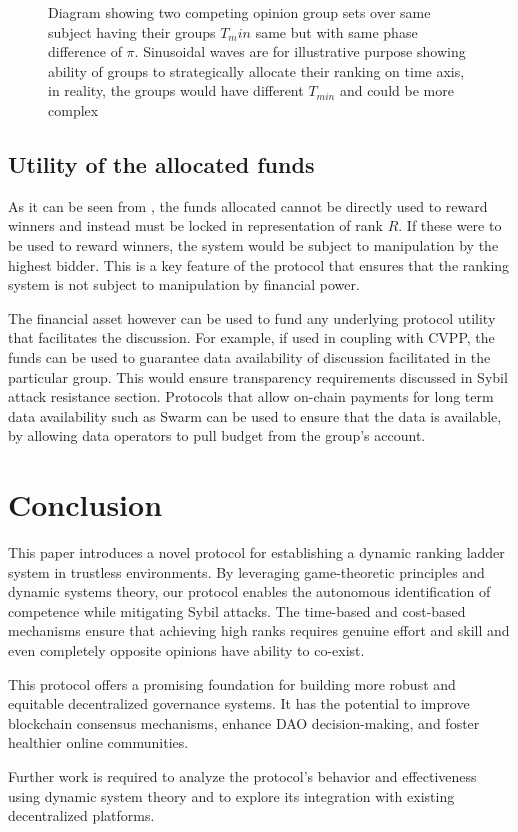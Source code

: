 \documentclass{article}
\begin{document}
\begin{CJK}{UTF8}{gbsn}
\begin{figure}[ht]
\begin{tikzpicture}
        \end{tikzpicture}
        \caption{Diagram showing two competing opinion group sets over same subject having their groups $T_min$ same but with same phase difference of $\pi$. Sinusoidal waves are for illustrative purpose showing ability of groups to strategically allocate their ranking on time axis, in reality, the groups would have different $T_{min}$ and could be more complex
            \label{fig:processes-sinusoidal}}
    \end{figure}

    \subsection*{Utility of the allocated funds}
    As it can be seen from , the funds allocated cannot be directly used to reward winners and instead must be locked in representation of rank $R$. If these were to be used to reward winners, the system would be subject to manipulation by the highest bidder. This is a key feature of the protocol that ensures that the ranking system is not subject to manipulation by financial power.

    The financial asset however can be used to fund any underlying protocol utility that facilitates the discussion. For example, if used in coupling with CVPP\cite{cvpp}, the funds can be used to guarantee data availability of discussion facilitated in the particular group. This would ensure transparency requirements discussed in Sybil attack resistance section. Protocols that allow on-chain payments for long term data availability such as Swarm \cite{swarm} can be used to ensure that the data is available, by allowing data operators to pull budget from the group's account.

    \section{Conclusion}

    This paper introduces a novel protocol for establishing a dynamic ranking ladder system in trustless environments. By leveraging game-theoretic principles and dynamic systems theory, our protocol enables the autonomous identification of competence while mitigating Sybil attacks. The time-based and cost-based mechanisms ensure that achieving high ranks requires genuine effort and skill and even completely opposite opinions have ability to co-exist.

    This protocol offers a promising foundation for building more robust and equitable decentralized governance systems. It has the potential to improve blockchain consensus mechanisms, enhance DAO decision-making, and foster healthier online communities.

    Further work is required to analyze the protocol's behavior and effectiveness using dynamic system theory and to explore its integration with existing decentralized platforms.

    \clearpage

    
    

    \clearpage\end{CJK}
\end{document}
